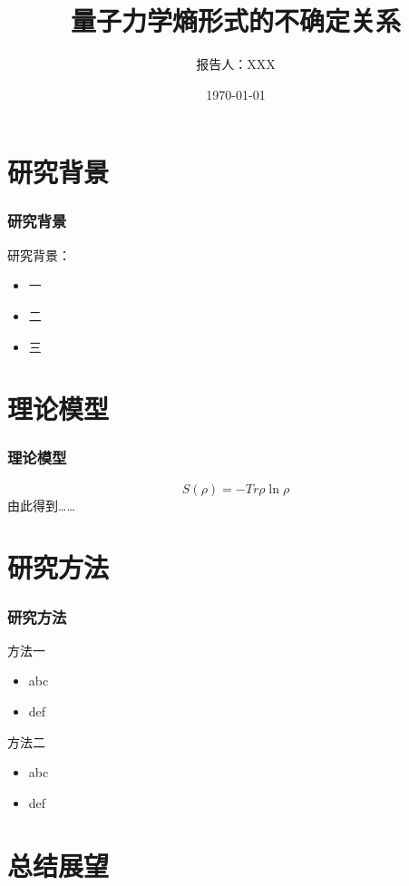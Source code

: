 \documentclass[12pt]{ctexbeamer}
\title[底部简明标题]{
    量子力学熵形式的不确定关系
}
\author[底部演讲者]{报告人：XXX}
\institute[USTC]{
理论物理研究组\\
中国科学技术大学，近代物理系
}
\date{\today}
\begin{document}
\startPresentation{}

\section{研究背景}
\begin{frame}
  \frametitle{研究背景}
  研究背景：
  \begin{itemize}
    \item 一
    \item 二
    \item 三
  \end{itemize}
\end{frame}


\section{理论模型}

\begin{frame}
  \frametitle{理论模型}
  \begin{equation*}
    S\left(\rho\right)=-Tr\rho\ln\rho
  \end{equation*}
  \pause
  由此得到……

\end{frame}


\section{研究方法}

\begin{frame}
  \frametitle{研究方法}
  \begin{block}{方法一}
    \begin{itemize}
      \item abc
      \item def
    \end{itemize}
  \end{block}
  \pause
  \begin{block}{方法二}
    \begin{itemize}
      \item abc
      \item def
    \end{itemize}
  \end{block}
\end{frame}


\section{总结展望}
\end{document}
